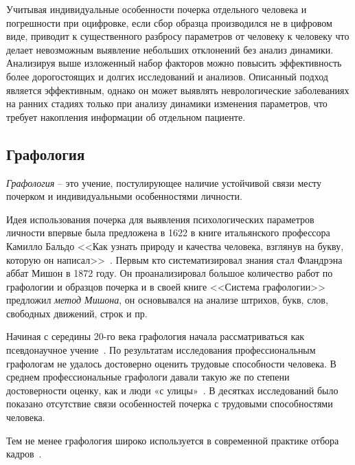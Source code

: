 Учитывая индивидуальные особенности почерка отдельного человека и погрешности при оцифровке, если сбор образца производился не в цифровом виде, приводит к существенного разбросу параметров от человеку к человеку что делает невозможным выявление небольших отклонений без анализ динамики.
Анализируя выше изложенный набор факторов можно повысить эффективность более дорогостоящих и долгих исследований и анализов.
Описанный подход является эффективным, однако он может выявлять неврологические заболеваниях на ранних стадиях только при анализу динамики изменения параметров, что требует накопления информации об отдельном пациенте.

\subsection{Графология}
\label{sub:domain:grafologic}
\emph{Графология} -- это учение, постулирующее наличие устойчивой связи месту почерком и индивидуальными особенностями личности.

Идея использования почерка для выявления психологических параметров личности впервые была предложена в 1622 в книге итальянского профессора Камилло Бальдо <<Как узнать природу и качества человека, взглянув на букву, которую он написал>>~\cite{kamillo_grafology}. Первым кто систематизировал знания стал Фландрэна аббат Мишон в 1872 году. Он проанализировал большое количество работ по графологии и образцов почерка и в своей книге <<Система графологии>> предложил \emph{метод Мишона}, он основывался на анализе штрихов, букв, слов, свободных движений, строк и пр.~\cite{mishon_grafology}

Начиная с середины 20-го века графология начала рассматриваться как псевдонаучное учение~\cite{graphology_wiki}. По результатам исследования профессиональным графологам не удалось достоверно оценить трудовые способности человека. В среднем профессиональные графологи давали такую же по степени достоверности оценку, как и люди «с улицы»~\cite{neter_shakhar_psevdograph, king_koehler_psevdograph}. В десятках исследований было показано отсутствие связи особенностей почерка с трудовыми способностями человека.

Тем не менее графология широко используется в современной практике отбора кадров~\cite{graphology_psyfactor}.

